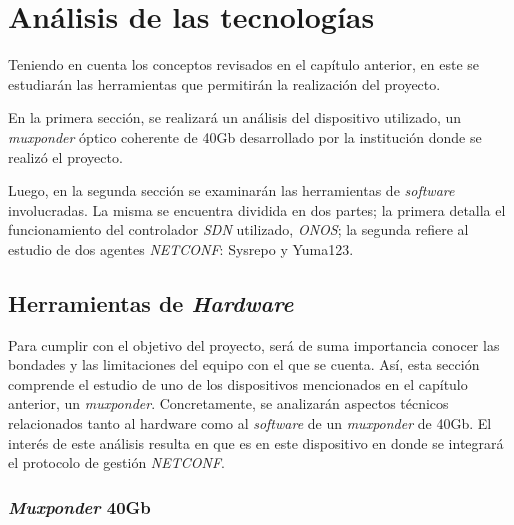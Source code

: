  
\chapter{Análisis de las tecnologías} %

\label{Chapter3} %

Teniendo en cuenta los conceptos revisados en el capítulo anterior, en este se estudiarán las herramientas que permitirán la realización del proyecto. 

En la primera sección, se realizará un análisis del dispositivo utilizado, un \textit{muxponder} óptico coherente de 40Gb desarrollado por la institución donde se realizó el proyecto.

Luego, en la segunda sección se examinarán las herramientas de \textit{software} involucradas. La misma se encuentra dividida en dos partes; la primera detalla el funcionamiento del controlador \textit{SDN} utilizado, \textit{ONOS}; la segunda refiere al estudio de dos agentes \textit{NETCONF}: Sysrepo y Yuma123.



\section{Herramientas de \textit{Hardware}}

Para cumplir con el objetivo del proyecto, será de suma importancia conocer las bondades y las limitaciones del equipo con el que se cuenta. Así, esta sección comprende el estudio de uno de los dispositivos mencionados en el capítulo anterior, un \textit{muxponder}. Concretamente, se analizarán aspectos técnicos relacionados tanto al hardware como al \textit{software} de un \textit{muxponder} de 40Gb. El interés de este análisis resulta en que es en este dispositivo en donde se integrará el protocolo de gestión \textit{NETCONF}.

\subsection{\textit{Muxponder} 40Gb}

